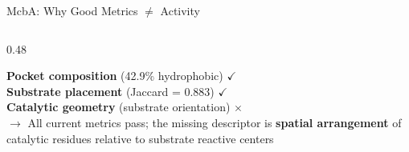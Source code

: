 \documentclass[aspectratio=169, 11pt]{beamer}
\begin{document}
\begin{frame}{McbA: Why Good Metrics $\neq$ Activity}
\begin{columns}[T]
\begin{column}{0.48\textwidth}
\vspace{4pt}
\colorbox{lightblue!50}{\parbox{0.92\textwidth}{\centering\scriptsize
\textbf{Pocket composition} (42.9\% hydrophobic) $\checkmark$\\
\textbf{Substrate placement} (Jaccard = 0.883) $\checkmark$\\
\textbf{Catalytic geometry} (substrate orientation) \textcolor{accentred}{\textbf{$\times$}}\\[2pt]
$\rightarrow$ All current metrics pass; the missing descriptor is \textbf{spatial arrangement} of catalytic residues relative to substrate reactive centers
}}
\end{column}
\end{columns}
\end{frame}

\end{document}

